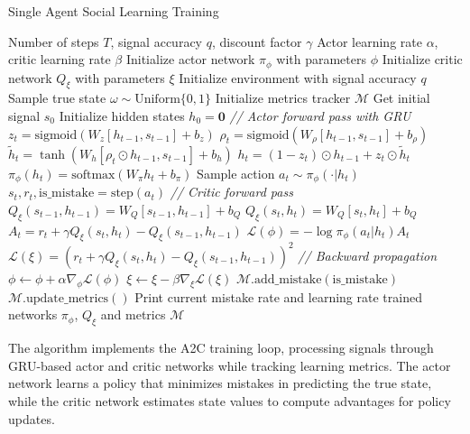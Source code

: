 \begin{algorithm}[H]
\caption{Single Agent Social Learning Training}
\label{alg:single-agent-training}
    \begin{algorithmic}[1]
    \Require Number of steps $T$, signal accuracy $q$, discount factor $\gamma$
    \Require Actor learning rate $\alpha$, critic learning rate $\beta$
    \State Initialize actor network $\pi_{\phi}$ with parameters $\phi$
    \State Initialize critic network $Q_{\xi}$ with parameters $\xi$
    \State Initialize environment with signal accuracy $q$
    \State Sample true state $\omega \sim \text{Uniform}\{0,1\}$
    \State Initialize metrics tracker $\mathcal{M}$
    \State Get initial signal $s_0$
    \State Initialize hidden states $h_0 = \mathbf{0}$
        \State \textit{// Actor forward pass with GRU}
        \State $z_t = \text{sigmoid}(W_z[h_{t-1}, s_{t-1}] + b_z)$
        \State $\rho_t = \text{sigmoid}(W_\rho[h_{t-1}, s_{t-1}] + b_\rho)$
        \State $\tilde{h}_t = \tanh(W_h[\rho_t \odot h_{t-1}, s_{t-1}] + b_h)$
        \State $h_t = (1-z_t) \odot h_{t-1} + z_t \odot \tilde{h}_t$
        \State $\pi_{\phi}(h_t) = \text{softmax}(W_{\pi}h_t + b_{\pi})$
        \State Sample action $a_t \sim \pi_{\phi}(\cdot|h_t)$
        \State $s_t, r_t, \text{is\_mistake} = \text{step}(a_t)$ 
        \State \textit{// Critic forward pass}
        \State $Q_{\xi}(s_{t-1}, h_{t-1}) = W_Q[s_{t-1}, h_{t-1}] + b_Q$
        \State $Q_{\xi}(s_t, h_t) = W_Q[s_t, h_t] + b_Q$
        \State $A_t = r_t + \gamma Q_{\xi}(s_t, h_t) - Q_{\xi}(s_{t-1}, h_{t-1})$
        \State $\mathcal{L}(\phi) = -\log \pi_{\phi}(a_t|h_t) A_t$ 
        \State $\mathcal{L}(\xi) = (r_t + \gamma Q_{\xi}(s_t, h_t) - Q_{\xi}(s_{t-1}, h_{t-1}))^2$ 
        \State \textit{// Backward propagation}
        \State $\phi \leftarrow \phi + \alpha \nabla_{\phi} \mathcal{L}(\phi)$ 
        \State $\xi \leftarrow \xi - \beta \nabla_{\xi} \mathcal{L}(\xi)$ 
        \State $\mathcal{M}.\text{add\_mistake}(\text{is\_mistake})$
        \State $\mathcal{M}.\text{update\_metrics}()$
            \State Print current mistake rate and learning rate
        \EndIf
    \EndFor
    \State \Return trained networks $\pi_{\phi}$, $Q_{\xi}$ and metrics $\mathcal{M}$
    \end{algorithmic}
\end{algorithm}

The algorithm implements the A2C training loop, processing signals through GRU-based actor and critic networks while tracking learning metrics. The actor network learns a policy that minimizes mistakes in predicting the true state, while the critic network estimates state values to compute advantages for policy updates.

